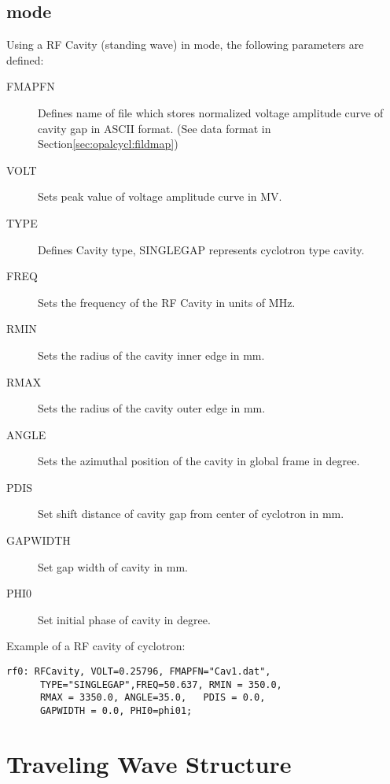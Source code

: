 \subsection{\opalcycl mode}
\label{sec:cavity-cycl}
Using a RF Cavity (standing wave) in \opalcycl mode, the following  parameters are defined:
\begin{description}
\item[FMAPFN]
  Defines name of file which stores normalized voltage amplitude curve of cavity gap in ASCII format.
  (See data format in Section\ref{sec:opalcycl:fildmap})
 \item[VOLT]
  Sets peak value of voltage amplitude curve in MV.
  \item[TYPE]
  Defines Cavity type, SINGLEGAP represents cyclotron type cavity.   
  \item[FREQ]
  Sets the frequency of the RF Cavity in units of MHz. 
  \item[RMIN]
  Sets the radius of the cavity inner edge in mm.
  \item[RMAX]
  Sets the radius of the cavity outer edge in mm.

  \item[ANGLE]
  Sets the azimuthal position of the cavity in global frame in degree. 

  \item[PDIS]
  Set shift distance of cavity gap from center of cyclotron in mm.
  
  \item[GAPWIDTH]
  Set gap width of  cavity in mm.

  \item[PHI0]
  Set initial phase of cavity in degree.

\end{description}

\noindent Example of a RF cavity of cyclotron:
\begin{verbatim}
rf0: RFCavity, VOLT=0.25796, FMAPFN="Cav1.dat",
      TYPE="SINGLEGAP",FREQ=50.637, RMIN = 350.0,
      RMAX = 3350.0, ANGLE=35.0,   PDIS = 0.0,
      GAPWIDTH = 0.0, PHI0=phi01;
\end{verbatim}

\section{Traveling Wave Structure}
\label{sec:travelingwave}
